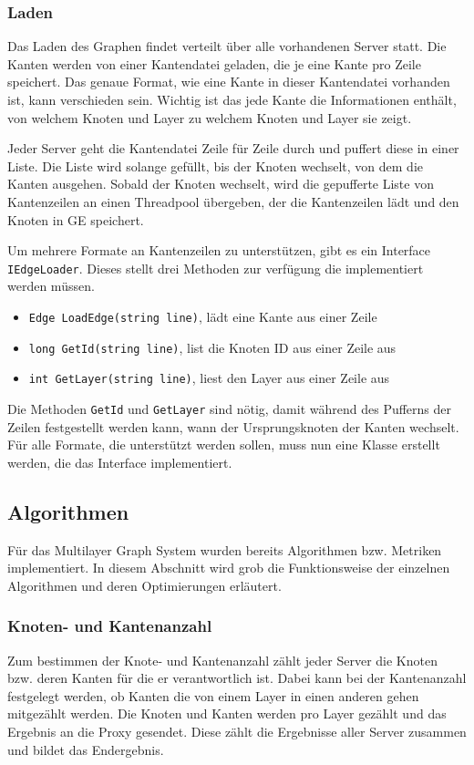\subsubsection{Laden}

Das Laden des Graphen findet verteilt über alle vorhandenen Server statt. Die Kanten werden von einer Kantendatei geladen, die je eine Kante pro Zeile speichert. Das genaue Format, wie eine Kante in dieser Kantendatei vorhanden ist, kann verschieden sein. Wichtig ist das jede Kante die Informationen enthält, von welchem Knoten und Layer zu welchem Knoten und Layer sie zeigt.

Jeder Server geht die Kantendatei Zeile für Zeile durch und puffert diese in einer Liste. Die Liste wird solange gefüllt, bis der Knoten wechselt, von dem die Kanten ausgehen. Sobald der Knoten wechselt, wird die gepufferte Liste von Kantenzeilen an einen Threadpool übergeben, der die Kantenzeilen lädt und den Knoten in GE speichert.

Um mehrere Formate an Kantenzeilen zu unterstützen, gibt es ein Interface \verb|IEdgeLoader|. Dieses stellt drei Methoden zur verfügung die implementiert werden müssen.

\begin{itemize}
  \item \verb|Edge LoadEdge(string line)|, lädt eine Kante aus einer Zeile
  \item \verb|long GetId(string line)|, list die Knoten ID aus einer Zeile aus
  \item \verb|int GetLayer(string line)|, liest den Layer aus einer Zeile aus
\end{itemize}

Die Methoden \verb|GetId| und \verb|GetLayer| sind nötig, damit während des Pufferns der Zeilen festgestellt werden kann, wann der Ursprungsknoten der Kanten wechselt.
Für alle Formate, die unterstützt werden sollen, muss nun eine Klasse erstellt werden, die das Interface implementiert.


\subsection{Algorithmen}

Für das Multilayer Graph System wurden bereits Algorithmen bzw. Metriken implementiert. In diesem Abschnitt wird grob die Funktionsweise der einzelnen Algorithmen und deren Optimierungen erläutert.


\subsubsection{Knoten- und Kantenanzahl}
Zum bestimmen der Knote- und Kantenanzahl zählt jeder Server die Knoten bzw. deren Kanten für die er verantwortlich ist. Dabei kann bei der Kantenanzahl festgelegt werden, ob Kanten die von einem Layer in einen anderen gehen mitgezählt werden.
Die Knoten und Kanten werden pro Layer gezählt und das Ergebnis an die Proxy gesendet. Diese zählt die Ergebnisse aller Server zusammen und bildet das Endergebnis.
 

